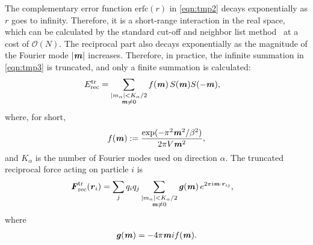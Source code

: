 \documentclass[journal=jacsat,manuscript=article]{achemso}
\renewcommand{\v}[1]{\textbf{\textit{#1}}}
\begin{document}
The complementary error function $\textrm{erfc}(r)$ in
\ref{eqn:tmp2} decays exponentially as $r$ goes to infinity.
Therefore, it is a short-range interaction in the real space, which
can be calculated by the standard cut-off and neighbor list
method~\cite{frenkel02b} at a cost of $\mathcal O(N)$.  The reciprocal
part also decays exponentially as the magnitude of the Fourier mode
$\vert\v m\vert$ increases. Therefore, in practice, the infinite
summation in \ref{eqn:tmp3} is truncated, and only a finite
summation is calculated:
\begin{align}\label{eqn:tmp6}
  E^{\textrm{tr}}_{\textrm{rec}} & =
  \sum_{
    \begin{subarray}{c}
      \vert m_\alpha\vert < K_\alpha/2\\
      \v m\neq 0
    \end{subarray}}
  f(\v m)\, S(\v m) S(-\v m),
\end{align}
where, for short,
\begin{align}
  f(\v m) := \frac{\exp(-\pi^2 \v m^2 / \beta^2)}{2\pi V \v m^2},
\end{align}
and $K_\alpha$ is the number of Fourier modes used on direction
$\alpha$.  The truncated reciprocal force acting on particle $i$ is
\begin{align}
  \v F^{\textrm{tr}}_{\textrm{rec}}(\v r_i)
  \label{eqn:tmp8}
  &= 
  \sum_j   q_iq_j
  \sum_{
    \begin{subarray}{c}
      \vert m_\alpha\vert < K_\alpha/2\\
      \v m\neq 0
    \end{subarray}}
  \v g(\v m) \,
  e^{2\pi i\v m\cdot\v r_{ij}},
\end{align}
where
\begin{align}
  \v g(\v m) = -4 \pi \v m i f(\v m).
\end{align}


\end{document}
